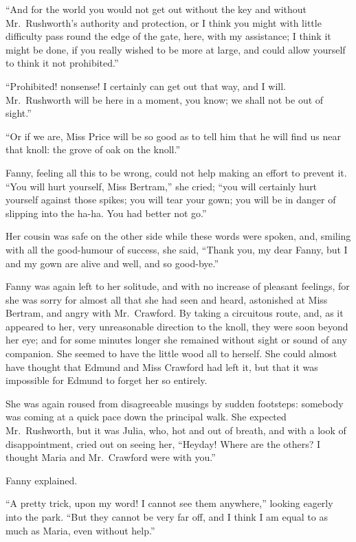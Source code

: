 ``And for the world you would not get out without the key
and without Mr.\ Rushworth's authority and protection,
or I think you might with little difficulty pass round
the edge of the gate, here, with my assistance; I think it
might be done, if you really wished to be more at large,
and could allow yourself to think it not prohibited.''

``Prohibited! nonsense!  I certainly can get out that way,
and I will.  Mr.\ Rushworth will be here in a moment,
you know; we shall not be out of sight.''

``Or if we are, Miss Price will be so good as to tell him
that he will find us near that knoll:  the grove of oak
on the knoll.''

Fanny, feeling all this to be wrong, could not help
making an effort to prevent it.  ``You will hurt yourself,
Miss Bertram,'' she cried; ``you will certainly hurt
yourself against those spikes; you will tear your gown;
you will be in danger of slipping into the ha-ha. You had
better not go.''

Her cousin was safe on the other side while these words
were spoken, and, smiling with all the good-humour
of success, she said, ``Thank you, my dear Fanny,
but I and my gown are alive and well, and so good-bye.''

Fanny was again left to her solitude, and with no increase
of pleasant feelings, for she was sorry for almost all
that she had seen and heard, astonished at Miss Bertram,
and angry with Mr.\ Crawford.  By taking a circuitous
route, and, as it appeared to her, very unreasonable
direction to the knoll, they were soon beyond her eye;
and for some minutes longer she remained without sight
or sound of any companion.  She seemed to have the little
wood all to herself.  She could almost have thought
that Edmund and Miss Crawford had left it, but that
it was impossible for Edmund to forget her so entirely.

She was again roused from disagreeable musings by sudden footsteps:
somebody was coming at a quick pace down the principal walk.
She expected Mr.\ Rushworth, but it was Julia, who,
hot and out of breath, and with a look of disappointment,
cried out on seeing her, ``Heyday!  Where are the others?
I thought Maria and Mr.\ Crawford were with you.''

Fanny explained.

``A pretty trick, upon my word!  I cannot see them anywhere,''
looking eagerly into the park.  ``But they cannot be very
far off, and I think I am equal to as much as Maria,
even without help.''

